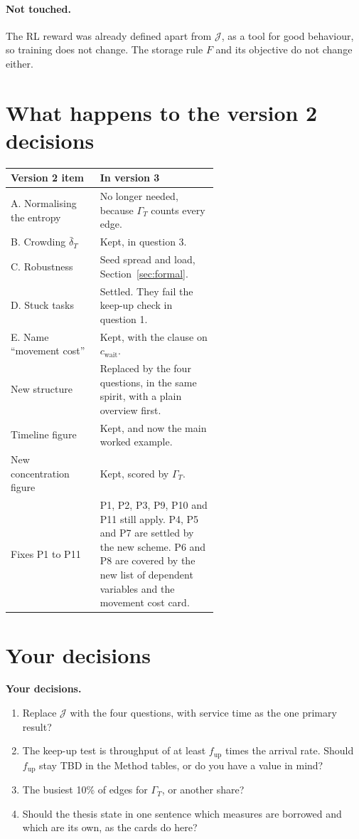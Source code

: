 \documentclass[11pt,a4paper]{article}
\newcommand{\ask}[1]{\par\smallskip\noindent\colorbox{askbg}{\parbox{\dimexpr\linewidth-2\fboxsep}{\textbf{Your decisions.} #1}}\par\smallskip}
\begin{document}
\paragraph{Not touched.} The RL reward was already defined apart from
$\mathcal{J}$, as a tool for good behaviour, so training does not change.
The storage rule $F$ and its objective do not change either.

\section{What happens to the version 2 decisions}

\begin{center}
\begin{tabular}{lp{0.58\linewidth}}
  \toprule
  Version 2 item & In version 3 \\
  \midrule
  A. Normalising the entropy & No longer needed, because $\Gamma_T$ counts every edge. \\
  B. Crowding $\bar\delta_T$ & Kept, in question 3. \\
  C. Robustness & Seed spread and load, Section~\ref{sec:formal}. \\
  D. Stuck tasks & Settled. They fail the keep-up check in question 1. \\
  E. Name ``movement cost'' & Kept, with the clause on $c_{\mathrm{wait}}$. \\
  New structure & Replaced by the four questions, in the same spirit,
    with a plain overview first. \\
  Timeline figure & Kept, and now the main worked example. \\
  New concentration figure & Kept, scored by $\Gamma_T$. \\
  Fixes P1 to P11 & P1, P2, P3, P9, P10 and P11 still apply. P4, P5 and
    P7 are settled by the new scheme. P6 and P8 are covered by the new
    list of dependent variables and the movement cost card. \\
  \bottomrule
\end{tabular}
\end{center}

\section{Your decisions}

\ask{\begin{enumerate}[nosep,leftmargin=1.2em]
  \item Replace $\mathcal{J}$ with the four questions, with service time
    as the one primary result?
  \item The keep-up test is throughput of at least $f_{\mathrm{up}}$ times
    the arrival rate. Should $f_{\mathrm{up}}$ stay TBD in the Method
    tables, or do you have a value in mind?
  \item The busiest 10\% of edges for $\Gamma_T$, or another share?
  \item Should the thesis state in one sentence which measures are
    borrowed and which are its own, as the cards do here?
\end{enumerate}}
\end{document}
